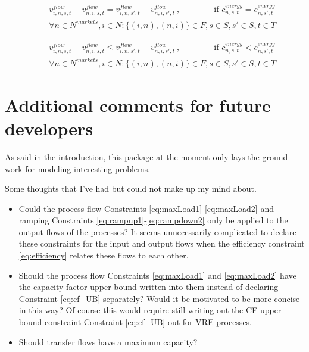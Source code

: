 \documentclass{article}
\begin{document}
\begin{align}
     & \quad v^{flow}_{i, n, s,t} - v^{flow}_{n, i, s,t} = v^{flow}_{i, n, s',t} - v^{flow}_{n, i ,s',t} \ , \nonumber \quad \quad \quad \quad \text{if } c^{energy}_{n,s,t} =c^{energy}_{n,s',t} \\[0.5cm]
    & \quad \forall n \in N^{markets}, i \in N: \{(i,n), (n,i)\} \in F,  s \in S, s'\in S, t \in T 
    \label{eq:bidEq}
\end{align}

\begin{align}
    & \quad v^{flow}_{i, n, s,t} - v^{flow}_{n, i, s,t} \leq v^{flow}_{i, n, s',t} - v^{flow}_{n, i ,s',t} \ , \nonumber \quad \quad \quad \quad \text{if } c^{energy}_{n,s,t} < c^{energy}_{n,s',t} \\[0.5cm]
    & \quad \forall n \in N^{markets}, i \in N: \{(i,n), (n,i)\} \in F,  s \in S, s'\in S, t \in T 
    \label{eq:bidIneq}
\end{align}


\section{Additional comments for future developers}

As said in the introduction, this package at the moment only lays the ground work for modeling interesting problems.

Some thoughts that I've had but could not make up my mind about.
\begin{itemize}
    \item Could the process flow Constraints \eqref{eq:maxLoad1}-\eqref{eq:maxLoad2} and ramping Constraints \eqref{eq:rampup1}-\eqref{eq:rampdown2} only be applied to the output flows of the processes? It seems unnecessarily complicated to declare these constraints for the input and output flows when the efficiency constraint \eqref{eq:efficiency} relates these flows to each other.
    
    \item Should the process flow Constraints \eqref{eq:maxLoad1} and \eqref{eq:maxLoad2} have the capacity factor upper bound written into them instead of declaring Constraint \eqref{eq:cf_UB} separately? Would it be motivated to be more concise in this way? Of course this would require still writing out the CF upper bound constraint Constraint \eqref{eq:cf_UB} out for VRE processes.
    
    \item Should transfer flows have a maximum capacity?
\end{itemize}
\end{document}
